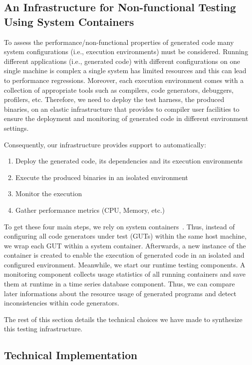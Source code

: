 \subsection{An Infrastructure for Non-functional Testing Using System Containers}
To assess the performance/non-functional properties of generated code many system configurations (i.e., execution environments) must be considered. Running different applications (i.e., generated code) with different configurations on one single machine is complex  a single system has limited resources and this can lead to performance regressions. Moreover, each execution environment comes with a collection of appropriate tools such as compilers, code generators, debuggers, profilers, etc. Therefore, we need to deploy the test harness, \ie the produced binaries, on an elastic infrastructure that provides to compiler user facilities to ensure the deployment and monitoring of generated code in different environment settings. 

Consequently, our infrastructure provides support to automatically:
\begin{enumerate}
	\item Deploy the generated code, its dependencies and its  execution environments
	\item Execute the produced binaries in an isolated environment 
	\item Monitor the execution 
	\item Gather performance metrics (CPU, Memory, etc.)
\end{enumerate}

To get these four main steps, we rely on system containers~\cite{soltesz2007container}. Thus, instead of configuring all code generators under test (GUTs) within the same host machine, we wrap each GUT within a system container. Afterwards, a new instance of the container is created to enable the execution of generated code in an isolated and configured environment. Meanwhile, we start our runtime testing components. A monitoring component collects usage statistics of all running containers and save them at runtime in a time series database component. Thus, we can compare later informations about the resource usage of generated programs and detect inconsistencies within code generators.


The rest of this section details the technical choices we have made to synthesize this testing infrastructure.

\subsection{Technical Implementation}

